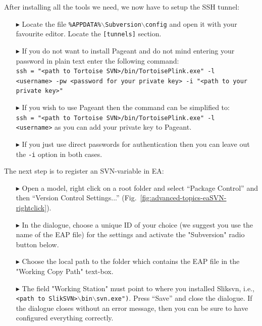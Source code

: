 After installing all the tools we need, we now have to setup the SSH tunnel:
   
\begin{enumerate}
  \item[$\blacktriangleright$] Locate the file \texttt{\%APPDATA\%$\backslash$Subversion$\backslash$config} and open it with your favourite editor. Locate the \texttt{[tunnels]} section.
  \item[$\blacktriangleright$] If you do not want to install Pageant and do not mind entering your password in plain text enter the following command:\\
  \texttt{ssh = "<path to Tortoise SVN>/bin/TortoisePlink.exe" -l \\<username> -pw <password for your private key> -i "<path to your private key>"}
  \item[$\blacktriangleright$] If you wish to use Pageant then the command can be simplified to:\\ \texttt{ssh = "<path to Tortoise SVN>/bin/TortoisePlink.exe" -l \\<username>} as you can add your private key to Pageant.
  \item[$\blacktriangleright$] If you just use direct passwords for authentication then you can leave out the \texttt{-i} option in both cases.
\end{enumerate}


The next step is to register an SVN-variable in EA:
\begin{enumerate}
  \item[$\blacktriangleright$] Open a model, right click on a root folder and select ``Package Control'' and then ``Version Control Settings...'' (Fig.~\ref{fig:advanced-topics-eaSVN-rightclick}).
  \item[$\blacktriangleright$] In the dialogue, choose a unique ID of your choice (we suggest you use the name of the EAP file) for the settings and activate the "Subversion" radio button below.
  \item[$\blacktriangleright$] Choose the local path to the folder which contains the EAP file in the "Working Copy Path" text-box.
  \item[$\blacktriangleright$] The field "Working Station" must point to where you installed Sliksvn, i.e., \texttt{<path to SlikSVN>$\backslash$bin$\backslash$svn.exe")}.  
  Press ``Save'' and close the dialogue.
  If the dialogue closes without an error message, then you can be sure to have configured everything correctly.
\end{enumerate}
 
